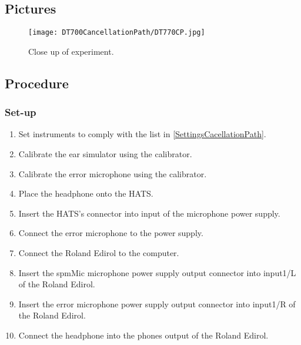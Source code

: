 \subsection{Pictures}

\begin{figure}[H]
	\centering
	\texttt{[image: DT700CancellationPath/DT770CP.jpg]}
	\caption{Close up of experiment.}
	\label{DT770CloseUpCancellationPath}
\end{figure}
\newpage
\subsection{Procedure}
\subsubsection{Set-up}
\begin{enumerate}
	\item Set instruments to comply with the list in \ref{SettingsCacellationPath}.
	\item Calibrate the ear simulator using the calibrator.
	\item Calibrate the error microphone using the calibrator.
	\item Place the headphone onto the HATS.
	\item Insert the HATS's connector into input of the microphone power supply.
	\item Connect the error microphone to the power supply.
	\item Connect the Roland Edirol to the computer.
	\item Insert the spmMic microphone power supply output connector into input1/L of the Roland Edirol.
	\item Insert the error microphone power supply output connector into input1/R of the Roland Edirol.
	\item Connect the headphone into the phones output of the Roland Edirol.
\end{enumerate}


